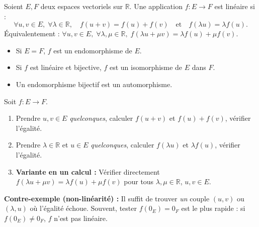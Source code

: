 \documentclass[11pt]{article}
\newcommand{\cle}[1]{{\popxbold\color{popdark}#1}}
\begin{document}
\begin{definition}
Soient $E,F$ deux espaces vectoriels sur $\mathbb{R}$. Une application $f:E\to F$ est \cle{linéaire} si :
\[ \forall u,v\in E,\; \forall \lambda\in\mathbb{R},\quad f(u+v)=f(u)+f(v)\quad\text{et}\quad f(\lambda u)=\lambda f(u). \]
Équivalentement : $\forall u,v\in E,\; \forall \lambda,\mu\in\mathbb{R},\; f(\lambda u+\mu v)=\lambda f(u)+\mu f(v)$.
\begin{itemize}
\item Si $E=F$, $f$ est un \cle{endomorphisme} de $E$.
\item Si $f$ est linéaire et bijective, $f$ est un \cle{isomorphisme} de $E$ dans $F$.
\item Un endomorphisme bijectif est un \cle{automorphisme}.
\end{itemize}
\end{definition}

\begin{methode}
Soit $f:E\to F$.
\begin{enumerate}
\item Prendre $u,v\in E$ \emph{quelconques}, calculer $f(u+v)$ et $f(u)+f(v)$, vérifier l'égalité.
\item Prendre $\lambda\in\mathbb{R}$ et $u\in E$ \emph{quelconques}, calculer $f(\lambda u)$ et $\lambda f(u)$, vérifier l'égalité.
\item \textbf{Variante en un calcul :} Vérifier directement $f(\lambda u+\mu v)=\lambda f(u)+\mu f(v)$ pour tous $\lambda,\mu\in\mathbb{R}$, $u,v\in E$.
\end{enumerate}
\textbf{Contre-exemple (non-linéarité) :} Il suffit de trouver \emph{un} couple $(u,v)$ ou $(\lambda,u)$ où l'égalité échoue. Souvent, tester $f(0_E)=0_F$ est le plus rapide : si $f(0_E)\neq 0_F$, $f$ n'est pas linéaire.
\end{methode}
\end{document}
